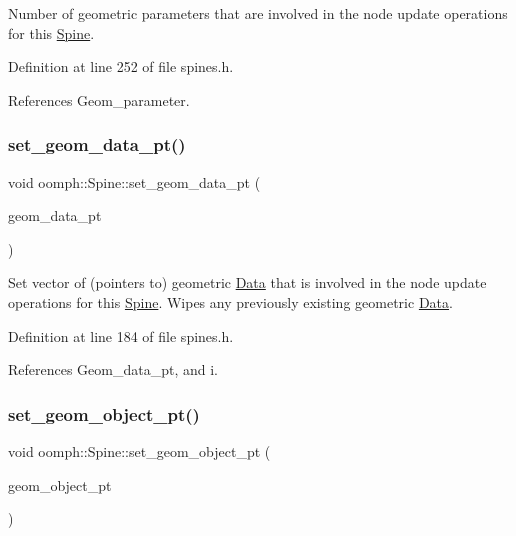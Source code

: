 Number of geometric parameters that are involved in the node update operations for this \hyperlink{classoomph_1_1Spine}{Spine}. 



Definition at line 252 of file spines.\+h.



References Geom\+\_\+parameter.

\mbox{\label{classoomph_1_1Spine_a32774ebc4f5f7b14c09e3abe045987e9}} 
\subsubsection{\texorpdfstring{set\+\_\+geom\+\_\+data\+\_\+pt()}{set\_geom\_data\_pt()}}
{\footnotesize\ttfamily void oomph\+::\+Spine\+::set\+\_\+geom\+\_\+data\+\_\+pt (\begin{DoxyParamCaption}\item[{const \hyperlink{classoomph_1_1Vector}{Vector}$<$ \hyperlink{classoomph_1_1Data}{Data} $\ast$$>$ \&}]{geom\+\_\+data\+\_\+pt }\end{DoxyParamCaption})\hspace{0.3cm}{\ttfamily [inline]}}



Set vector of (pointers to) geometric \hyperlink{classoomph_1_1Data}{Data} that is involved in the node update operations for this \hyperlink{classoomph_1_1Spine}{Spine}. Wipes any previously existing geometric \hyperlink{classoomph_1_1Data}{Data}. 



Definition at line 184 of file spines.\+h.



References Geom\+\_\+data\+\_\+pt, and i.

\mbox{\label{classoomph_1_1Spine_a7069dfe59a9f4c1ad487adf606f5931a}} 
\subsubsection{\texorpdfstring{set\+\_\+geom\+\_\+object\+\_\+pt()}{set\_geom\_object\_pt()}}
{\footnotesize\ttfamily void oomph\+::\+Spine\+::set\+\_\+geom\+\_\+object\+\_\+pt (\begin{DoxyParamCaption}\item[{const \hyperlink{classoomph_1_1Vector}{Vector}$<$ \hyperlink{classoomph_1_1GeomObject}{Geom\+Object} $\ast$$>$ \&}]{geom\+\_\+object\+\_\+pt }\end{DoxyParamCaption})\hspace{0.3cm}{\ttfamily [inline]}}



